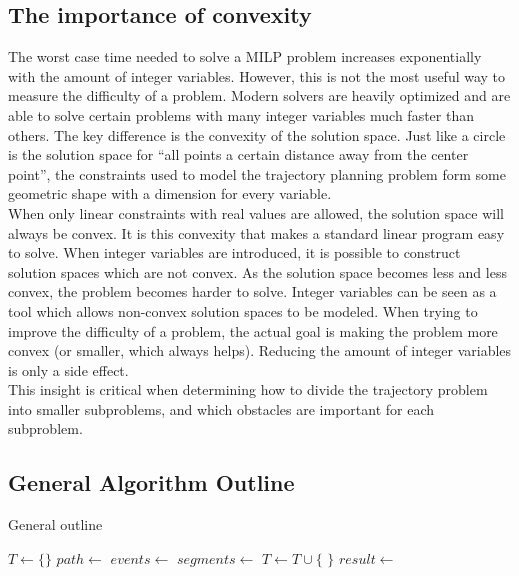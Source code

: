 \subsection{The importance of convexity}
The worst case time needed to solve a MILP problem increases exponentially with the amount of integer variables. However, this is not the most useful way to measure the difficulty of a problem. Modern solvers are heavily optimized and are able to solve certain problems with many integer variables much faster than others. The key difference is the convexity of the solution space. Just like a circle is the solution space for ``all points a certain distance away from the center point'', the constraints used to model the trajectory planning problem form some geometric shape with a dimension for every variable. \\
When only linear constraints with real values are allowed, the solution space will always be convex. It is this convexity that makes a standard linear program easy to solve. When integer variables are introduced, it is possible to construct solution spaces which are not convex. As the solution space becomes less and less convex, the problem becomes harder to solve. Integer variables can be seen as a tool which allows non-convex solution spaces to be modeled. When trying to improve the difficulty of a problem, the actual goal is making the problem more convex (or smaller, which always helps). Reducing the amount of integer variables is only a side effect. \\
This insight is critical when determining how to divide the trajectory problem into smaller subproblems, and which obstacles are important for each subproblem.

\subsection{General Algorithm Outline}
\begin{algorithm}
\caption{General outline}
\label{alg:outline}
\begin{algorithmic}[1]
\State $T \leftarrow \{\}$ 
\State $path \leftarrow$ 
\State $events \leftarrow$ 
\State $segments \leftarrow$ 
\State {}
\State {}
\State {}
\State $T \leftarrow T \cup \{$  $\}$
\EndFor
\State $result \leftarrow $
\end{algorithmic}
\end{algorithm}

